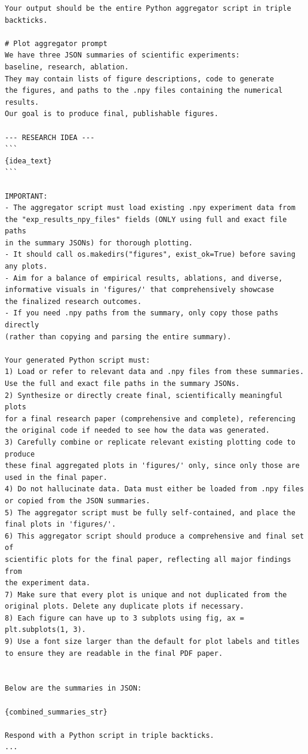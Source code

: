\documentclass[11pt, a4paper]{include/gdm_format}
\begin{document}
\begin{tcolorbox}[breakable, colback=orange!5!white, colframe=orange!75!black, title=Plot Aggregation Prompt]
\begin{verbatim}
Your output should be the entire Python aggregator script in triple backticks.

# Plot aggregator prompt
We have three JSON summaries of scientific experiments: 
baseline, research, ablation.
They may contain lists of figure descriptions, code to generate 
the figures, and paths to the .npy files containing the numerical results.
Our goal is to produce final, publishable figures.

--- RESEARCH IDEA ---
```
{idea_text}
```

IMPORTANT:
- The aggregator script must load existing .npy experiment data from 
the "exp_results_npy_files" fields (ONLY using full and exact file paths 
in the summary JSONs) for thorough plotting.
- It should call os.makedirs("figures", exist_ok=True) before saving any plots.
- Aim for a balance of empirical results, ablations, and diverse, 
informative visuals in 'figures/' that comprehensively showcase 
the finalized research outcomes.
- If you need .npy paths from the summary, only copy those paths directly 
(rather than copying and parsing the entire summary).

Your generated Python script must:
1) Load or refer to relevant data and .npy files from these summaries. 
Use the full and exact file paths in the summary JSONs.
2) Synthesize or directly create final, scientifically meaningful plots 
for a final research paper (comprehensive and complete), referencing 
the original code if needed to see how the data was generated.
3) Carefully combine or replicate relevant existing plotting code to produce 
these final aggregated plots in 'figures/' only, since only those are 
used in the final paper.
4) Do not hallucinate data. Data must either be loaded from .npy files 
or copied from the JSON summaries.
5) The aggregator script must be fully self-contained, and place the 
final plots in 'figures/'.
6) This aggregator script should produce a comprehensive and final set of 
scientific plots for the final paper, reflecting all major findings from 
the experiment data.
7) Make sure that every plot is unique and not duplicated from the 
original plots. Delete any duplicate plots if necessary.
8) Each figure can have up to 3 subplots using fig, ax = plt.subplots(1, 3).
9) Use a font size larger than the default for plot labels and titles 
to ensure they are readable in the final PDF paper.


Below are the summaries in JSON:

{combined_summaries_str}

Respond with a Python script in triple backticks.
...
\end{verbatim}
\end{tcolorbox}
\end{document}
